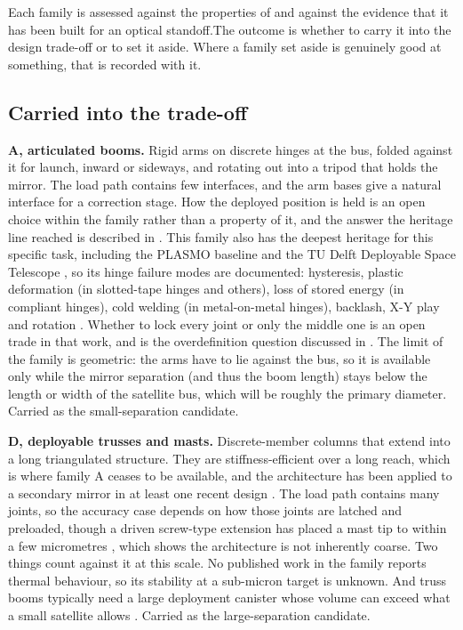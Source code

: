 Each family is assessed against the properties of  and against the evidence that it has been built for an optical standoff.The outcome is whether to carry it into the design trade-off or to set it aside.  Where a family set aside is genuinely good at something, that is recorded with it.

\subsection*{Carried into the trade-off}

\textbf{A, articulated booms.} Rigid arms on discrete hinges at the bus, folded against it for launch, inward or sideways, and rotating out into a tripod that holds the mirror. The load path contains few interfaces, and the arm bases give a natural interface for a correction stage. How the deployed position is held is an open choice within the family rather than a property of it, and the answer the heritage line reached is described in . This family also has the deepest heritage for this specific task, including the PLASMO baseline \cite{bouwmeester_enabling_2023} and the TU Delft Deployable Space Telescope \cite{krikken_design_2018, akkerhuis_deployable_2020, gritter_assessing_2020, hobijn_design_2023}, so its hinge failure modes are documented: hysteresis, plastic deformation (in slotted-tape hinges and others), loss of stored energy (in compliant hinges), cold welding (in metal-on-metal hinges), backlash, X-Y play and rotation \cite{hobijn_design_2023, liu_thin-walled_2024, villalba_review_2020}. Whether to lock every joint or only the middle one is an open trade in that work, and is the overdefinition question discussed in . The limit of the family is geometric: the arms have to lie against the bus, so it is available only while the mirror separation (and thus the boom length) stays below the length or width of the satellite bus, which will be roughly the primary diameter. Carried as the small-separation candidate.

\textbf{D, deployable trusses and masts.} Discrete-member columns that extend into a long triangulated structure. They are stiffness-efficient over a long reach, which is where family A ceases to be available, and the architecture has been applied to a secondary mirror in at least one recent design \cite{kempenaers_deployable_2025}. The load path contains many joints, so the accuracy case depends on how those joints are latched and preloaded, though a driven screw-type extension has placed a mast tip to within a few micrometres \cite{wang_design_2026}, which shows the architecture is not inherently coarse. Two things count against it at this scale. No published work in the family reports thermal behaviour, so its stability at a sub-micron target is unknown. And truss booms typically need a large deployment canister whose volume can exceed what a small satellite allows \cite{belvin_advanced_2016}. Carried as the large-separation candidate.

